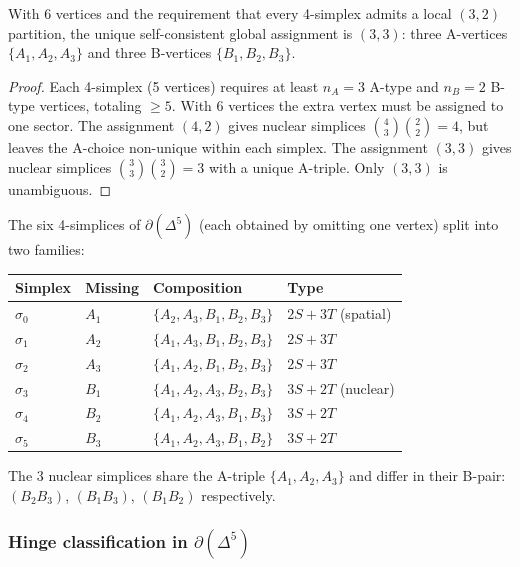 \begin{proposition}
\label{prop:33_partition}
With 6 vertices and the requirement that every 4-simplex admits a local $(3,2)$ partition, the unique self-consistent global assignment is $(3,3)$: three A-vertices $\{A_1, A_2, A_3\}$ and three B-vertices $\{B_1, B_2, B_3\}$.
\end{proposition}

\begin{proof}
Each 4-simplex (5 vertices) requires at least $n_A = 3$ A-type and $n_B = 2$ B-type vertices, totaling $\geq 5$.  With 6 vertices the extra vertex must be assigned to one sector.  The assignment $(4, 2)$ gives nuclear simplices $\binom{4}{3}\binom{2}{2} = 4$, but leaves the A-choice non-unique within each simplex.  The assignment $(3, 3)$ gives nuclear simplices $\binom{3}{3}\binom{3}{2} = 3$ with a unique A-triple.  Only $(3, 3)$ is unambiguous.
\end{proof}

The six 4-simplices of $\partial(\Delta^5)$ (each obtained by omitting one vertex) split into two families:

\begin{center}
\begin{tabular}{llll}
\toprule
Simplex & Missing & Composition & Type \\
\midrule
$\sigma_0$ & $A_1$ & $\{A_2,A_3,B_1,B_2,B_3\}$ & $2S{+}3T$ (spatial) \\
$\sigma_1$ & $A_2$ & $\{A_1,A_3,B_1,B_2,B_3\}$ & $2S{+}3T$ \\
$\sigma_2$ & $A_3$ & $\{A_1,A_2,B_1,B_2,B_3\}$ & $2S{+}3T$ \\
$\sigma_3$ & $B_1$ & $\{A_1,A_2,A_3,B_2,B_3\}$ & $3S{+}2T$ (nuclear) \\
$\sigma_4$ & $B_2$ & $\{A_1,A_2,A_3,B_1,B_3\}$ & $3S{+}2T$ \\
$\sigma_5$ & $B_3$ & $\{A_1,A_2,A_3,B_1,B_2\}$ & $3S{+}2T$ \\
\bottomrule
\end{tabular}
\end{center}

\noindent
The 3 nuclear simplices share the A-triple $\{A_1, A_2, A_3\}$ and differ in their B-pair: $(B_2 B_3)$, $(B_1 B_3)$, $(B_1 B_2)$ respectively.

\subsubsection{Hinge classification in $\partial(\Delta^5)$}

